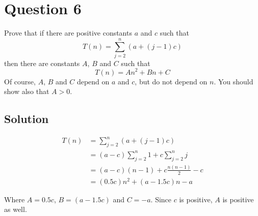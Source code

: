 
\section*{Question 6}

Prove that if there are positive constants $a$ and $c$ such that
\begin{equation}
T(n) = \sum_{j=2}^{n}(a + (j-1)c)
\end{equation}
then there are constants $A$, $B$ and $C$ such that
\begin{equation}
T(n) = An^2 + Bn + C
\end{equation}
Of course, $A$, $B$ and $C$ depend on $a$ and $c$, but do not depend on $n$. You should show also that $A > 0$.

\subsection*{Solution}

\begin{equation}
\begin{aligned}
T(n) &= \sum_{j=2}^{n}(a + (j-1)c)\\
&=(a-c)\sum_{j=2}^{n}1+c\sum_{j=2}^{n}j\\
&=(a-c)(n-1)+c\frac{n(n-1)}{2}-c\\
&=(0.5c)n^2+(a-1.5c)n-a
\end{aligned}
\end{equation}

Where $A = 0.5c$, $B = (a - 1.5c)$ and $C = -a$. Since $c$ is positive, $A$ is positive as well.
